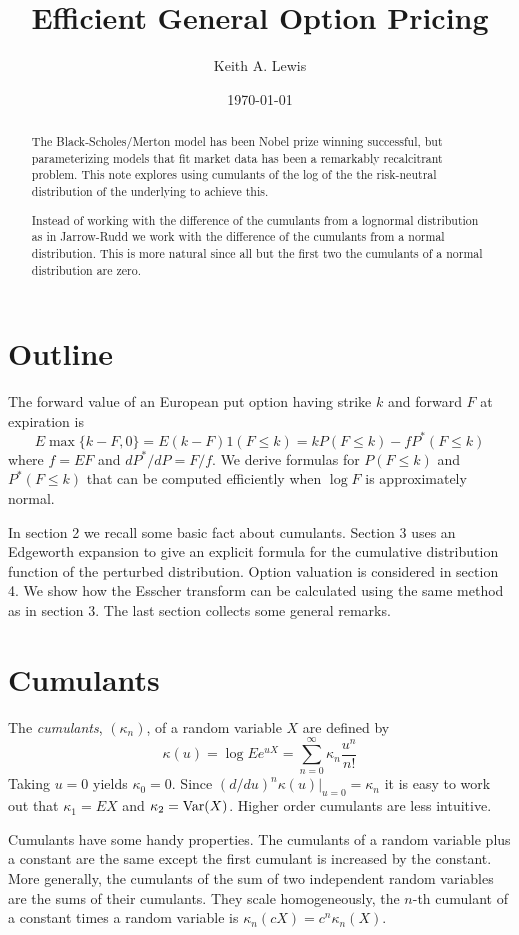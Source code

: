 \documentclass[11pt]{article}
\title{Efficient General Option Pricing}
\author{Keith A. Lewis}
\date{\today}
\newcommand{\Var}{\mathop{\rm{Var}}}
\theoremstyle{remark}
\begin{document}
\maketitle
\begin{abstract}
The Black-Scholes/Merton model has been Nobel prize winning successful,
but parameterizing models that fit market data has been a remarkably
recalcitrant problem. This note explores using cumulants of the
log of the the risk-neutral distribution of the underlying to
achieve this.

Instead of working with the difference of the cumulants from a lognormal
distribution as in Jarrow-Rudd \cite{JarRud1982} we work with the
difference of the cumulants from a normal distribution.  This is more
natural since all but the first two the cumulants of a normal distribution
are zero.
\end{abstract}

\section{Outline}
The forward value of an European put option having strike \(k\)
and forward $F$ at expiration is
\[
E\max\{k - F, 0\} = E(k - F)1(F \le k) = kP(F\le k) - fP^*(F\le k)
\]
where $f = EF$ and $dP^*/dP = F/f$. We derive formulas for
\(P(F\le k)\) and \(P^*(F\le k)\) that can be computed
efficiently when $\log F$ is approximately normal.

In section 2 we recall some basic fact about cumulants.
Section 3 uses an Edgeworth expansion to give an explicit formula for
the cumulative distribution function of the perturbed distribution.
Option valuation is considered in section 4. We show how the
Esscher transform can be calculated using the same method as in
section 3. The last section collects some
general remarks.

\section{Cumulants}

The {\em cumulants}, \((\kappa_n)\), of a random variable \(X\)
are defined by
\[
\kappa(u) = \log Ee^{uX} = \sum_{n=0}^\infty \kappa_n \frac{u^n}{n!}
\]
Taking \(u = 0\) yields \(\kappa_0 = 0\). Since
\((d/du)^n\kappa(u)|_{u = 0} = \kappa_n\) it is easy to
work out that
\(\kappa_1 = EX\) and \(\kappa_2 = \Var(X)\). Higher order
cumulants are less intuitive.

Cumulants have some handy properties. 
The cumulants of a random variable plus a constant are the 
same except the first cumulant is increased by the constant.
More generally, the cumulants of the sum of two independent 
random variables are the sums of their cumulants.
They scale homogeneously, the \(n\)-th cumulant of a constant
times a random variable is
\(\kappa_n(cX) = c^n\kappa_n(X)\).
\end{document}
